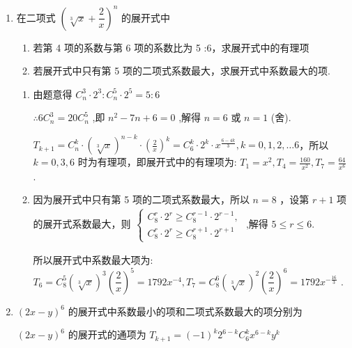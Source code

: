 \begin{enumerate}
\begin{enumerate}
        \item 在二项式 ${\left( \sqrt[3]{x} + \dfrac{2}{x}\right) }^{n}$ 的展开式中
        \begin{enumerate}
            \item 若第 4 项的系数与第 6 项的系数比为 5 :6，求展开式中的有理项
            \item 若展开式中只有第 5 项的二项式系数最大，求展开式中系数最大的项.
        \end{enumerate}
        \begin{jieda}
            \begin{enumerate}
                \item 由题意得 ${{C}}_{n}^{3} \cdot  {2}^{3} : {{C}}_{n}^{5} \cdot  {2}^{5} = 5 : 6$ 
                
                $\therefore 6{{C}}_{n}^{3} = {20}{{C}}_{n}^{5}$ ,即 ${n}^{2} - {7n} + 6 = 0$ ,解得 $n = 6$ 或 $n = 1$ (舍).
                
                ${T}_{k + 1} = {{C}}_{n}^{k} \cdot  {\left( \sqrt[3]{x}\right) }^{n - k} \cdot  {\left( \frac{2}{x}\right) }^{k} = {{C}}_{6}^{k} \cdot  {2}^{k} \cdot  {x}^{\frac{6 - {4k}}{3}},k = 0,1,2,\ldots 6$，所以 $k = 0,3,6$ 时为有理项，即展开式中的有理项为: ${T}_{1} = {x}^{2},{T}_{4} = \frac{160}{{x}^{2}},{T}_{7} = \frac{64}{{x}^{6}}$ .
                \item 因为展开式中只有第 5 项的二项式系数最大，所以 $n = 8$ ，设第 $r + 1$ 项的展开式系数最大，则$\begin{array}{l} \left\{  \begin{array}{l} {{C}}_{8}^{r} \cdot  {2}^{r} \geq  {{C}}_{8}^{r - 1} \cdot  {2}^{r - 1}, \\  {{C}}_{8}^{r} \cdot  {2}^{r} \geq  {{C}}_{8}^{r + 1} \cdot  {2}^{r + 1} \end{array}\right. \text{ ,解得 }5 \leq  r \leq  6. \end{array}$

                所以展开式中系数最大项为: ${T}_{6} = {{C}}_{8}^{5}{\left( \sqrt[3]{x}\right) }^{3}{\left( \dfrac{2}{x}\right) }^{5} = {1792}{x}^{-4},{T}_{7} = {{C}}_{8}^{6}{\left( \sqrt[3]{x}\right) }^{2}{\left( \dfrac{2}{x}\right) }^{6} = {1792}{x}^{-\frac{16}{3}}$ .
            \end{enumerate}
        \end{jieda}

        \item $({2x} - y)^{6}$ 的展开式中系数最小的项和二项式系数最大的项分别为 
        \begin{jieda}
            ${\left( 2x - y\right) }^{6}$ 的展开式的通项为 ${T}_{k + 1} = {\left( -1\right) }^{k}{2}^{6 - k}{{C}}_{6}^{k}{x}^{6 - k}{y}^{k}$
            

\end{jieda}
\end{enumerate}
\end{enumerate}

